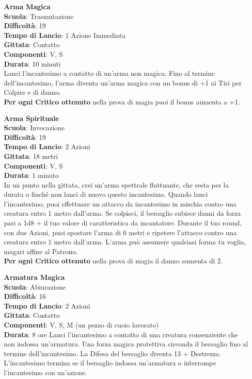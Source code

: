 \begin{multicols}{2}
\medskip\textbf{Arma Magica}\\
\textbf{Scuola}: Trasmutazione\\
\textbf{Difficoltà}: 19\\
\textbf{Tempo di Lancio}: 1 Azione Immediata\\
\textbf{Gittata}: Contatto\\
\textbf{Componenti}: V, S\\
\textbf{Durata}: 10 minuti\\
Lanci l'incantesimo a contatto di un'arma non magica. Fino al termine dell'incantesimo, l'arma diventa un'arma magica con un bonus di +1 ai Tiri per Colpire e di danno.\\
\textbf{Per ogni Critico ottenuto} nella prova di magia puoi il bonus aumenta a +1.

\medskip\textbf{Arma Spirituale}\\
\textbf{Scuola}: Invocazione\\
\textbf{Difficoltà}: 19\\
\textbf{Tempo di Lancio}: 2 Azioni\\
\textbf{Gittata}: 18 metri\\
\textbf{Componenti}: V, S\\
\textbf{Durata}: 1 minuto\\
In un punto nella gittata, crei un'arma spettrale fluttuante, che resta per la durata o finché non lanci di nuovo questo incantesimo. Quando lanci l'incantesimo, puoi effettuare un attacco da incantesimo in mischia contro una creatura entro 1 metro dall'arma. Se colpisci, il bersaglio subisce danni da forza pari a 1d8 + il tuo valore di caratteristica da incantatore. Durante il tuo round, con due Azioni, puoi spostare l'arma di 6 metri e ripetere l'attacco contro una creatura entro 1 metro dall'arma. L'arma può assumere qualsiasi forma tu voglia, magari affine al Patrono.\\
\textbf{Per ogni Critico ottenuto} nella prova di magia il danno aumenta di 2.

\medskip\textbf{Armatura Magica}\\
\textbf{Scuola}: Abiurazione\\
\textbf{Difficoltà}: 16\\
\textbf{Tempo di Lancio}: 2 Azioni\\
\textbf{Gittata}: Contatto\\
\textbf{Componenti}: V, S, M (un pezzo di cuoio lavorato)\\
\textbf{Durata}: 8 ore
Lanci l'incantesimo a contatto di una creatura consenziente che non indossa un'armatura. Una forza magica protettiva circonda il bersaglio fino al termine dell'incantesimo. La Difesa del bersaglio diventa 13 + Destrezza. L'incantesimo termina se il bersaglio indossa un'armatura o interrompe l'incantesimo con un'azione.



\end{multicols}
